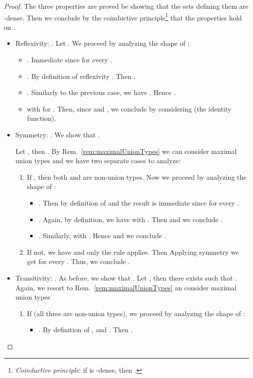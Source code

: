 \begin{proof}
The three properties are proved be showing that the sets defining them are
-dense. Then we conclude by the coinductive
principle\footnote{\emph{Coinductive principle}: if  is -dense, then
.} that the properties hold on .
\begin{itemize}
  \item Reflexivity: . Let . We proceed by analyzing the shape
  of :
  \begin{itemize}
    \item . Immediate since  for
    every .
    
    \item . By definition of reflexivity
    . Then .
    
    \item . Similarly to the previous case, we
    have . Hence
    .
    
    \item  with 
    for . Then, since  and
    , we conclude
     by considering 
    (the identity function).
  \end{itemize}
  
  
  \item Symmetry: . We show that .
  
  Let , then
  . By Rem.~\ref{rem:maximalUnionTypes} we
  can consider maximal union types  and we have two separate cases to analyze:
  \begin{enumerate}
    \item If , then both  and  are non-union types. Now we
    proceed by analyzing the shape of :
    \begin{itemize}
      \item . Then  by definition of  and the
      result is immediate since  for every .
      
      \item . Again, by definition, we have
       with . Then  and we conclude .
      
      \item . Similarly,  with . Hence  and we conclude .
    \end{itemize}
    
    \item If not, we have  and only the rule 
    applies. Then  Applying symmetry we get  for every
    . Thus, we conclude .
  \end{enumerate}
  
  
  \item Transitivity: .
  As before, we show that . Let , then there exists  such that
  . Again, we resort to
  Rem.~\ref{rem:maximalUnionTypes} an consider maximal union types 
  \begin{enumerate}
    \item If  (\ie all three are non-union types), we proceed by
    analyzing the shape of :
  \begin{itemize}
	  \item . By definition of ,  and . Then .
	  

\end{itemize}
\end{enumerate}
\end{itemize}
\end{proof}
